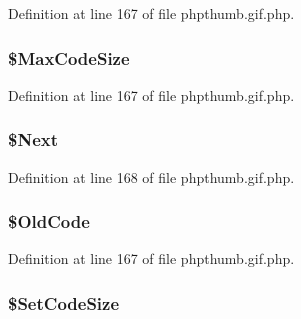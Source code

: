 \-Definition at line 167 of file phpthumb.\-gif.\-php.

\hypertarget{class_c_g_i_f_l_z_w_ae66010f0834a599faa1be34f17a0a736}{
\subsubsection[{\$\-Max\-Code\-Size}]{\setlength{\rightskip}{0pt plus 5cm}\$\-Max\-Code\-Size}}\label{class_c_g_i_f_l_z_w_ae66010f0834a599faa1be34f17a0a736}


\-Definition at line 167 of file phpthumb.\-gif.\-php.

\hypertarget{class_c_g_i_f_l_z_w_a49b04707c85d624de6900e2691e9c8d1}{
\subsubsection[{\$\-Next}]{\setlength{\rightskip}{0pt plus 5cm}\$\-Next}}\label{class_c_g_i_f_l_z_w_a49b04707c85d624de6900e2691e9c8d1}


\-Definition at line 168 of file phpthumb.\-gif.\-php.

\hypertarget{class_c_g_i_f_l_z_w_aea43fbe54b0fc542d1779e224c924059}{
\subsubsection[{\$\-Old\-Code}]{\setlength{\rightskip}{0pt plus 5cm}\$\-Old\-Code}}\label{class_c_g_i_f_l_z_w_aea43fbe54b0fc542d1779e224c924059}


\-Definition at line 167 of file phpthumb.\-gif.\-php.

\hypertarget{class_c_g_i_f_l_z_w_aa75321356d6efcba0ab0efb8359f6956}{
\subsubsection[{\$\-Set\-Code\-Size}]{\setlength{\rightskip}{0pt plus 5cm}\$\-Set\-Code\-Size}}\label{class_c_g_i_f_l_z_w_aa75321356d6efcba0ab0efb8359f6956}


